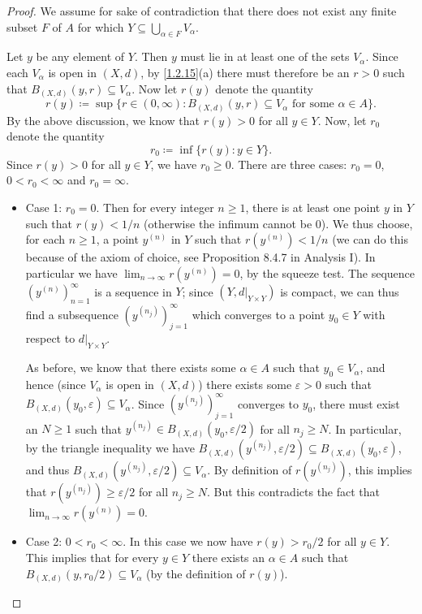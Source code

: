 \begin{proof}
  We assume for sake of contradiction that there does not exist any finite subset \(F\) of \(A\) for which \(Y \subseteq \bigcup_{\alpha \in F} V_{\alpha}\).

  Let \(y\) be any element of \(Y\).
  Then \(y\) must lie in at least one of the sets \(V_{\alpha}\).
  Since each \(V_{\alpha}\) is open in \((X, d)\), by \cref{1.2.15}(a) there must therefore be an \(r > 0\) such that \(B_{(X, d)}(y, r) \subseteq V_{\alpha}\).
  Now let \(r(y)\) denote the quantity
  \[
    r(y) \coloneqq \sup\big\{r \in (0, \infty) : B_{(X, d)}(y, r) \subseteq V_{\alpha} \text{ for some } \alpha \in A\big\}.
  \]
  By the above discussion, we know that \(r(y) > 0\) for all \(y \in Y\).
  Now, let \(r_0\) denote the quantity
  \[
    r_0 \coloneqq \inf\big\{r(y) : y \in Y\big\}.
  \]
  Since \(r(y) > 0\) for all \(y \in Y\), we have \(r_0 \geq 0\).
  There are three cases: \(r_0 = 0\), \(0 < r_0 < \infty\) and \(r_0 = \infty\).
  \begin{itemize}
    \item Case 1:
          \(r_0 = 0\).
          Then for every integer \(n \geq 1\), there is at least one point \(y\) in \(Y\) such that \(r(y) < 1 / n\) (otherwise the infimum cannot be \(0\)).
          We thus choose, for each \(n \geq 1\), a point \(y^{(n)}\) in \(Y\) such that \(r(y^{(n)}) < 1 / n\)
          (we can do this because of the axiom of choice, see Proposition 8.4.7 in Analysis I).
          In particular we have \(\lim_{n \to \infty} r(y^{(n)}) = 0\), by the squeeze test.
          The sequence \((y^{(n)})_{n = 1}^\infty\) is a sequence in \(Y\);
          since \((Y, d|_{Y \times Y})\) is compact, we can thus find a subsequence \((y^{(n_j)})_{j = 1}^\infty\) which converges to a point \(y_0 \in Y\) with respect to \(d|_{Y \times Y}\).

          As before, we know that there exists some \(\alpha \in A\) such that \(y_0 \in V_{\alpha}\), and hence (since \(V_{\alpha}\) is open in \((X, d)\)) there exists some \(\varepsilon > 0\) such that \(B_{(X, d)}(y_0, \varepsilon) \subseteq V_{\alpha}\).
          Since \((y^{(n_j)})_{j = 1}^\infty\) converges to \(y_0\), there must exist an \(N \geq 1\) such that \(y^{(n_j)} \in B_{(X, d)}(y_0, \varepsilon / 2)\) for all \(n_j \geq N\).
          In particular, by the triangle inequality we have \(B_{(X, d)}(y^{(n_j)}, \varepsilon / 2) \subseteq B_{(X, d)}(y_0, \varepsilon)\), and thus \(B_{(X, d)}(y^{(n_j)}, \varepsilon / 2) \subseteq V_{\alpha}\).
          By definition of \(r(y^{(n_j)})\), this implies that \(r(y^{(n_j)}) \geq \varepsilon / 2\) for all \(n_j \geq N\).
          But this contradicts the fact that \(\lim_{n \to \infty} r(y^{(n)}) = 0\).
    \item Case 2:
          \(0 < r_0 < \infty\).
          In this case we now have \(r(y) > r_0 / 2\) for all \(y \in Y\).
          This implies that for every \(y \in Y\) there exists an \(\alpha \in A\) such that \(B_{(X, d)}(y, r_0 / 2) \subseteq V_{\alpha}\) (by the definition of \(r(y)\)).


\end{itemize}
\end{proof}
